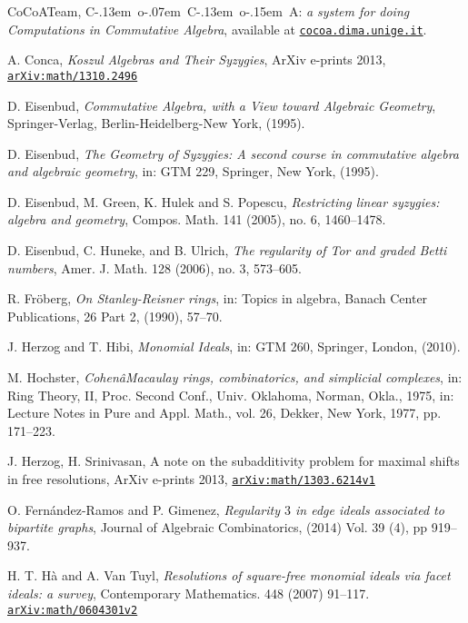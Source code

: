 \documentclass[a4paper,11pt]{amsart}
\theoremstyle{plain}
\theoremstyle{definition}
\theoremstyle{remark}
\begin{document}
\begin{thebibliography}{99999}
CoCoATeam, {{\hbox{\rm C\kern-.13em o\kern-.07em C\kern-.13em o\kern-.15em A}}}: \textit{a system for doing Computations in Commutative Algebra}, available at \href{http://cocoa.dima.unige.it}{\texttt{cocoa.dima.unige.it}}.

A. Conca, \textit{Koszul Algebras and Their Syzygies}, ArXiv e-prints 2013, \href{http://arxiv.org/abs/1310.2496}{\texttt{arXiv:math/1310.2496}}

D. Eisenbud, \textit{Commutative Algebra, with a View toward Algebraic Geometry}, Springer-Verlag, Berlin-Heidelberg-New York, (1995).

D. Eisenbud, \textit{The Geometry of Syzygies: A second course in commutative algebra and algebraic geometry}, in: GTM 229, Springer, New York, (1995).

D. Eisenbud, M. Green, K. Hulek and S. Popescu, \textit{Restricting linear syzygies: algebra and geometry}, Compos. Math. 141 (2005), no. 6, 1460--1478.

D. Eisenbud, C. Huneke, and B. Ulrich, \textit{The regularity of Tor and graded Betti
numbers}, Amer. J. Math. 128 (2006), no. 3, 573--605.

R. Fr\"{o}berg, \textit{On Stanley-Reisner rings}, in: Topics in algebra, Banach Center Publications, 26 Part 2, (1990), 57--70.

J. Herzog and T. Hibi, \textit{Monomial Ideals}, in: GTM 260, Springer, London, (2010).

M. Hochster, \textit{CohenâMacaulay rings, combinatorics, and simplicial complexes}, in: Ring Theory, II, Proc. Second Conf., Univ. Oklahoma, Norman, Okla., 1975, in: Lecture Notes in Pure and Appl. Math., vol. 26, Dekker, New York, 1977, pp. 171--223.

J. Herzog, H. Srinivasan, A note on the subadditivity problem for maximal shifts in free resolutions, ArXiv e-prints 2013, \href{http://arxiv.org/abs/1303.6214}{\texttt{arXiv:math/1303.6214v1}}

O. Fern{\'a}ndez-Ramos and P. Gimenez, \emph{Regularity $3$ in edge ideals associated to bipartite graphs}, Journal of Algebraic Combinatorics, (2014) Vol. 39 (4), pp 919--937. 

H. T. H\`a and A. Van Tuyl, \textit{Resolutions of square-free monomial ideals via facet ideals: a survey}, Contemporary Mathematics. 448 (2007) 91--117. \href{http://arxiv.org/abs/math/0604301}{\texttt{arXiv:math/0604301v2}}


\end{thebibliography}
\end{document}

